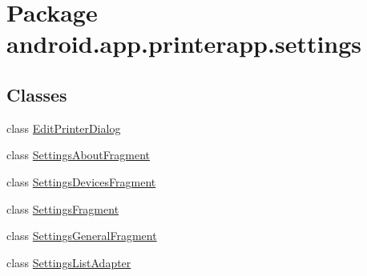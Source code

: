 \hypertarget{namespaceandroid_1_1app_1_1printerapp_1_1settings}{}\section{Package android.\+app.\+printerapp.\+settings}
\label{namespaceandroid_1_1app_1_1printerapp_1_1settings}
\subsection*{Classes}
\begin{DoxyCompactItemize}
\item 
class \hyperlink{classandroid_1_1app_1_1printerapp_1_1settings_1_1_edit_printer_dialog}{Edit\+Printer\+Dialog}
\item 
class \hyperlink{classandroid_1_1app_1_1printerapp_1_1settings_1_1_settings_about_fragment}{Settings\+About\+Fragment}
\item 
class \hyperlink{classandroid_1_1app_1_1printerapp_1_1settings_1_1_settings_devices_fragment}{Settings\+Devices\+Fragment}
\item 
class \hyperlink{classandroid_1_1app_1_1printerapp_1_1settings_1_1_settings_fragment}{Settings\+Fragment}
\item 
class \hyperlink{classandroid_1_1app_1_1printerapp_1_1settings_1_1_settings_general_fragment}{Settings\+General\+Fragment}
\item 
class \hyperlink{classandroid_1_1app_1_1printerapp_1_1settings_1_1_settings_list_adapter}{Settings\+List\+Adapter}
\end{DoxyCompactItemize}
